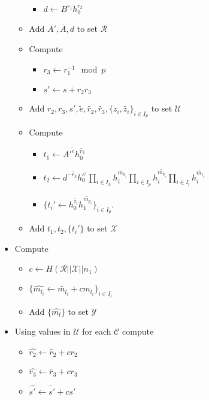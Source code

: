 \documentclass[a4paper]{article}
\begin{document}
\begin{itemize}
\begin{itemize}
\begin{itemize}
                \item $d\leftarrow B^{r_1}h_0^{r_2}$
            \end{itemize}
        \item Add $A', \overline{A}, d$ to set $\mathcal{R}$
        \item Compute     
            \begin{itemize}                \item $r_3\leftarrow r_1^{-1} \mod p$
                \item $s'\leftarrow s+r_2r_3$
            \end{itemize}
        \item Add $r_2, r_3, s' , \widetilde{e},\widetilde{r_2},\widetilde{r_3},\{z_i, \widetilde{z_i}\}_{i \in I_p}$ to set $\mathcal{U}$
        \item Compute 
        \begin{itemize}
                \item $t_1\leftarrow A'^{\widetilde{e}}h_0^{\widetilde{r_2}}$
                \item $t_2 \leftarrow  d^{-\widetilde{r_3}}h_0^{\widetilde{s'}}\prod_{i\in I_h}h_i^{\widetilde{m_{h_i}}}\prod_{i\in I_p}h_i^{\widetilde{m_{p_i}}}\prod_{i\in I_l}h_i^{\widetilde{m_{l_i}}}$
                \item $\{t_i'\leftarrow h_0^{\widetilde{z_i}}h_1^{\widetilde{m_{p_i}}}\}_{i\in I_p}$.
            \end{itemize}
        \item Add $t_1, t_2, \{t_i'\}$ to set $\mathcal{X}$
    \end{itemize}
    \item Compute 
    \begin{itemize}
        \item $c \leftarrow H(\mathcal{R}||\mathcal{X}||n_1)$
        \item $\{\widehat{m_{l_i}} \leftarrow \widetilde{m_{l_i}} + c m_{l_i}\}_{i \in I_l}$
        \item Add $\{\widehat{m_l}\}$ to set $\mathcal{Y}$
    \end{itemize}
    \item Using values in $\mathcal{U}$ for each $\mathcal{C}$ compute
    \begin{itemize}
        \item $\widehat{r_2} \leftarrow \widetilde{r_2} + c r_2$
        \item $\widehat{r_3} \leftarrow \widetilde{r_3} + c r_3$
        \item $\widehat{s'} \leftarrow \widetilde{s'} + c s'$

\end{itemize}
\end{itemize}
\end{document}
